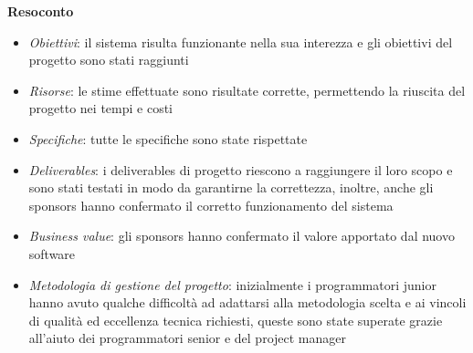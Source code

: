 \textbf{Resoconto}
\begin{itemize}
    \item \textit{Obiettivi}: il sistema risulta funzionante nella sua interezza e gli obiettivi del progetto sono 
    stati raggiunti
    \item \textit{Risorse}: le stime effettuate sono risultate corrette, permettendo la riuscita del progetto nei
    tempi e costi
    \item \textit{Specifiche}: tutte le specifiche sono state rispettate
    \item \textit{Deliverables}: i deliverables di progetto riescono a raggiungere il loro scopo e sono stati testati 
    in modo da garantirne la correttezza, inoltre, anche gli sponsors hanno confermato il corretto funzionamento 
    del sistema
    \item \textit{Business value}: gli sponsors hanno confermato il valore apportato dal nuovo software
    \item \textit{Metodologia di gestione del progetto}: inizialmente i programmatori junior hanno avuto qualche 
    difficoltà ad adattarsi alla metodologia scelta e ai vincoli di qualità ed eccellenza tecnica richiesti, 
    queste sono state superate grazie all'aiuto dei programmatori senior e del project manager
\end{itemize}